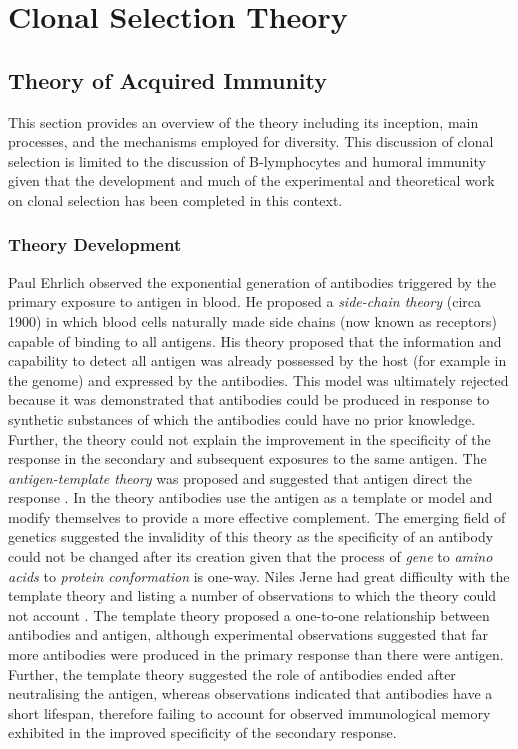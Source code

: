 %
%
\section{Clonal Selection Theory}
\label{sec:cs:theory}

%
%
\subsection{Theory of Acquired Immunity}
\label{subsec:cs:theory:acquiredimmunity}
This section provides an overview of the theory including its inception, main processes, and the mechanisms employed for diversity. This discussion of clonal selection is limited to the discussion of B-lymphocytes and humoral immunity given that the development and much of the experimental and theoretical work on clonal selection has been completed in this context.

%
%
\subsubsection{Theory Development}
\label{subsubsec:theory:development}
Paul Ehrlich observed the exponential generation of antibodies triggered by the primary exposure to antigen in blood. He proposed a \emph{side-chain theory} (circa 1900) in which blood cells naturally made side chains (now known as receptors) capable of binding to all antigens. His theory proposed that the information and capability to detect all antigen was already possessed by the host (for example in the genome) and expressed by the antibodies. This model was ultimately rejected because it was demonstrated that antibodies could be produced in response to synthetic substances of which the antibodies could have no prior knowledge. Further, the theory could not explain the improvement in the specificity of the response in the secondary and subsequent exposures to the same antigen. The \emph{antigen-template theory} was proposed and suggested that antigen direct the response \cite{Pauling1940}. In the theory antibodies use the antigen as a template or model and modify themselves to provide a more effective complement. The emerging field of genetics suggested the invalidity of this theory as the specificity of an antibody could not be changed after its creation given that the process of \emph{gene} to \emph{amino acids} to \emph{protein conformation} is one-way. Niles Jerne had great difficulty with the template theory and listing a number of observations to which the theory could not account \cite{Jerne1955}. The template theory proposed a one-to-one relationship between antibodies and antigen, although experimental observations suggested that far more antibodies were produced in the primary response than there were antigen. Further, the template theory suggested the role of antibodies ended after neutralising the antigen, whereas observations indicated that antibodies have a short lifespan, therefore failing to account for observed immunological memory exhibited in the improved specificity of the secondary response. 

